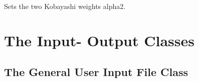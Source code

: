 \documentclass[letterpaper,10pt,english]{sphinxmanual}
\begin{document}
\begin{fulllineitems}
\begin{fulllineitems}
\end{fulllineitems}


\begin{fulllineitems}
\label{FittingClasses:Models.KobayashiPCCL.setKobWeights}
Sets the two Kobayashi weights alpha2.

\end{fulllineitems}


\end{fulllineitems}



\chapter{The Input- Output Classes}
\label{InputOutputClasses::doc}\label{InputOutputClasses:the-input-output-classes}

\section{The General User Input File Class}
\label{InputOutputClasses:the-general-user-input-file-class}
\end{document}
